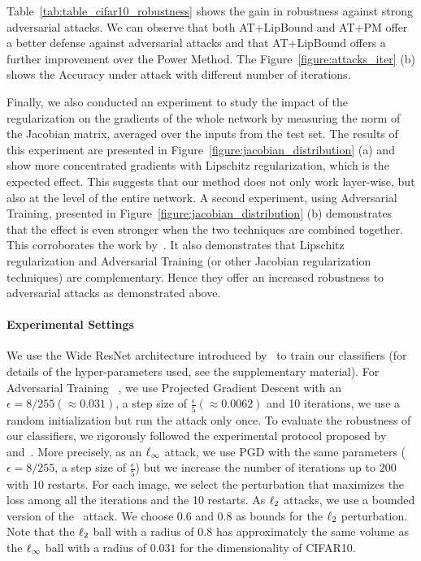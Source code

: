Table~\ref{tab:table_cifar10_robustness} shows the gain in robustness against strong adversarial attacks.
We can observe that both AT+LipBound and AT+PM offer a better defense against adversarial attacks and that AT+LipBound offers a further improvement over the Power Method.
The Figure~\ref{figure:attacks_iter} (b) shows the Accuracy under attack with different number of iterations. 

Finally, we also conducted an experiment to study the impact of the regularization on the gradients of the whole network by measuring the norm of the Jacobian matrix, averaged over the inputs from the test set.
The results of this experiment are presented in Figure~\ref{figure:jacobian_distribution} (a) and show more concentrated gradients with Lipschitz regularization, which is the expected effect.
This suggests that our method does not only work layer-wise, but also at the level of the entire network.
A second experiment, using Adversarial Training, presented in Figure~\ref{figure:jacobian_distribution} (b) demonstrates that the effect is even stronger when the two techniques are combined together.
This corroborates the work by~\cite{farnia2018generalizable}.
It also demonstrates that Lipschitz regularization and Adversarial Training (or other Jacobian regularization techniques) are complementary.
Hence they offer an increased robustness to adversarial attacks as demonstrated above.

\paragraph{Experimental Settings}
We use the Wide ResNet architecture introduced by~\citet{zagoruyko2016wide} to train our classifiers (for details of the hyper-parameters used, see the supplementary material).
For Adversarial Training ~\cite{madry2018towards}, we use Projected Gradient Descent with an $\epsilon = 8/255 (\approx 0.031)$, a step size of $\textstyle \frac{\epsilon}{5} (\approx 0.0062)$ and 10 iterations, we use a random initialization but run the attack only once.
To evaluate the robustness of our classifiers, we rigorously followed the experimental protocol proposed by~\citet{tramer2020adaptive} and~\citet{carlini2019evaluating}.
More precisely, as an $\ell_\infty$ attack, we use PGD with the same parameters ($\epsilon = 8/255$, a step size of $\textstyle \frac{\epsilon}{5}$) but we increase the number of iterations up to 200 with 10 restarts.
For each image, we select the perturbation that maximizes the loss among all the iterations and the 10 restarts.
As $\ell_2$ attacks, we use a bounded version of the~\cite{carlini2017towards} attack.
We choose $0.6$ and $0.8$ as bounds for the $\ell_2$ perturbation. Note that the $\ell_2$ ball with a radius of $0.8$ has approximately the same volume as the $\ell_\infty$ ball with a radius of $0.031$ for the dimensionality of CIFAR10. 


